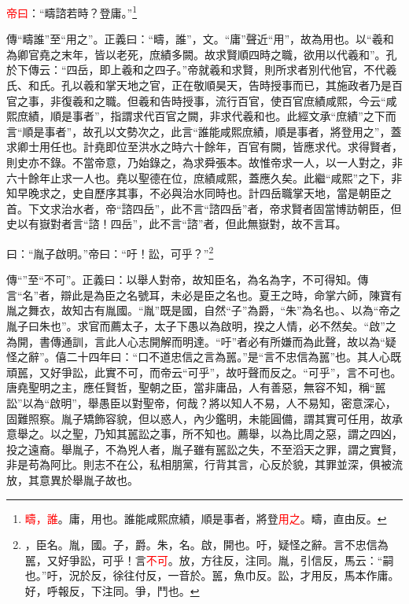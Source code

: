 \textcolor{red}{帝曰}：“疇諮若時？登庸。”\footnote{\textcolor{red}{疇，誰}。庸，用也。誰能咸熙庶績，順是事者，將登\textcolor{red}{用之}。疇，直由反。}

{\noindent\zhuan{}\fzbyks 傳“疇誰”至“用之”。正義曰：“疇，誰”，文。“庸”聲近“用”，故為用也。以“羲和為卿官堯之末年，皆以老死，庶績多闕。故求賢順四時之職，欲用以代羲和”。孔於下傳云：“四岳，即上羲和之四子。”帝就羲和求賢，則所求者別代他官，不代羲氏、和氏。孔以羲和掌天地之官，正在敬順昊天，告時授事而已，其施政者乃是百官之事，非復羲和之職。但羲和告時授事，流行百官，使百官庶績咸熙，今云“咸熙庶績，順是事者”，指謂求代百官之闕，非求代羲和也。此經文承“庶績”之下而言“順是事者”，故孔以文勢次之，此言“誰能咸熙庶績，順是事者，將登用之”，蓋求卿士用任也。計堯即位至洪水之時六十餘年，百官有闕，皆應求代。求得賢者，則史亦不錄。不當帝意，乃始錄之，為求舜張本。故惟帝求一人，以一人對之，非六十餘年止求一人也。堯以聖德在位，庶績咸熙，蓋應久矣。此繼“咸熙”之下，非知早晚求之，史自歷序其事，不必與治水同時也。計四岳職掌天地，當是朝臣之首。下文求治水者，帝“諮四岳”，此不言“諮四岳”者，帝求賢者固當博訪朝臣，但史以有嶽對者言“諮！四岳”，此不言“諮”者，但此無嶽對，故不言耳。 \par}

曰：“胤子啟明。”帝曰：“吁！訟，可乎？”\footnote{\textcolor{red}{}，臣名。胤，國。子，爵。朱，名。啟，開也。吁，疑怪之辭。言不忠信為嚚，又好爭訟，可乎！言\textcolor{red}{不可}。放，方往反，注同。胤，引信反，馬云：“嗣也。”吁，況於反，徐往付反，一音於。嚚，魚巾反。訟，才用反，馬本作庸。好，呼報反，下注同。爭，鬥也。}

{\noindent\zhuan{}\fzbyks 傳“”至“不可”。正義曰：以舉人對帝，故知臣名，為名為字，不可得知。傳言“名”者，辯此是為臣之名號耳，未必是臣之名也。夏王之時，命掌六師，陳寶有胤之舞衣，故知古有胤國。“胤”既是國，自然“子”為爵，“朱”為名也。、以為“帝之胤子曰朱也”。求官而薦太子，太子下愚以為啟明，揆之人情，必不然矣。“啟”之為開，書傳通訓，言此人心志開解而明達。“吁”者必有所嫌而為此聲，故以為“疑怪之辭”。僖二十四年曰：“口不道忠信之言為嚚。”是“言不忠信為嚚”也。其人心既頑嚚，又好爭訟，此實不可，而帝云“可乎”，故吁聲而反之。“可乎”，言不可也。唐堯聖明之主，應任賢哲，聖朝之臣，當非庸品，人有善惡，無容不知，稱“嚚訟”以為“啟明”，舉愚臣以對聖帝，何哉？將以知人不易，人不易知，密意深心，固難照察。胤子矯飾容貌，但以惑人，內少鑑明，未能圓備，謂其實可任用，故承意舉之。以之聖，乃知其嚚訟之事，所不知也。薦舉，以為比周之惡，謂之四凶，投之遠裔。舉胤子，不為兇人者，胤子雖有嚚訟之失，不至滔天之罪，謂之實賢，非是苟為阿比。則志不在公，私相朋黨，行背其言，心反於貌，其罪並深，俱被流放，其意異於舉胤子故也。 \par}

